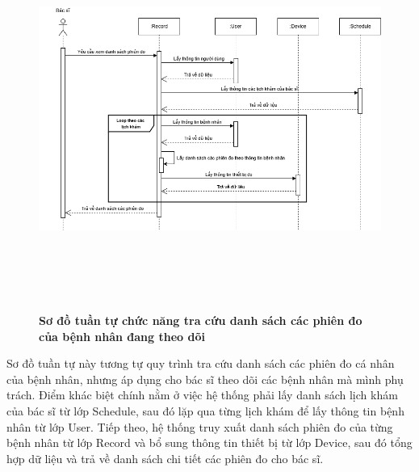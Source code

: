 \begin{figure}[H]
	\centering
	\includegraphics[width=15.8cm,height=12.5cm]{Images/sequence/record/getByDoctorId.drawio.png}
	\caption[Sơ đồ tuần tự chức năng tra cứu danh sách các phiên đo của bệnh nhân đang theo dõi]{\bfseries \fontsize{12pt}{0pt}
		\selectfont Sơ đồ tuần tự chức năng tra cứu danh sách các phiên đo của bệnh nhân đang theo dõi}
	\label{sequence_get_record_by_doctor} %
\end{figure}
Sơ đồ tuần tự này tương tự quy trình tra cứu danh sách các phiên đo cá nhân của bệnh nhân, nhưng áp dụng cho bác sĩ theo dõi các bệnh nhân mà mình phụ trách.
Điểm khác biệt chính nằm ở việc hệ thống phải lấy danh sách lịch khám của bác sĩ từ lớp Schedule, sau đó lặp qua từng lịch khám để lấy thông tin bệnh nhân từ lớp User.
Tiếp theo, hệ thống truy xuất danh sách phiên đo của từng bệnh nhân từ lớp Record và bổ sung thông tin thiết bị từ lớp Device, sau đó tổng hợp dữ liệu và trả về danh sách chi tiết các phiên đo cho bác sĩ.

